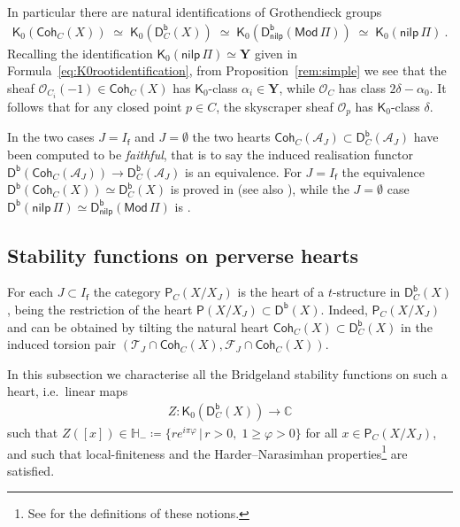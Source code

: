 \documentclass[reqno,a4paper]{amsart}
\newcommand{\calA}{\mathcal{A}}
\newcommand{\C}{\mathbb{C}}
\newcommand{\HH}{\mathbb{H}}
\newcommand{\scrF}{\mathscr{F}}
\newcommand{\scrO}{\mathscr{O}}
\newcommand{\scrT}{\mathscr{T}}
\newcommand{\sfK}{\mathsf{K}}
\newcommand{\sff}{\mathsf{f}}
\newcommand{\bfY}{\mathbf{Y}}
\newcommand{\catMod}{\mathsf{Mod}}
\newcommand{\catP}{\mathsf{P}}
\newcommand{\catPC}{\mathsf{P}_{C}}
\newcommand{\ModPi}{\catMod\, \Pi}
\newcommand{\nilpPi}{\mathsf{nilp}\, \Pi}
\newcommand{\catCohC}{\mathsf{Coh}_C}
\newcommand{\catDb}{\mathsf{D}^\mathsf{b}}
\newcommand{\catDbC}{\mathsf{D}^\mathsf{b}_C}
\newcommand{\rootlattice}{\bfY}
\newcommand{\rsv}{X}
\newcommand{\psv}{X_J}
\theoremstyle{basic-theorem}
\numberwithin{equation}{section}
\begin{document}
 In particular there are natural identifications of Grothendieck groups
\begin{align}
	\sfK_0(\catCohC(\rsv))\;\simeq\; \sfK_0(\catDbC(\rsv)) \;\simeq\; \sfK_0(\catDb_\mathsf{nilp}(\ModPi))\;\simeq\; \sfK_0(\nilpPi)\ .
\end{align}
Recalling the identification $\sfK_0(\nilpPi)\simeq \rootlattice$ given in Formula~\eqref{eq:K0rootidentification}, from Proposition~\ref{rem:simple} we see that the sheaf
$\scrO_{C_i}(-1)\in \catCohC(\rsv)$ has $\sfK_0$-class $\alpha_i\in \rootlattice$, while $\scrO_C$ has class $2\delta-\alpha_0$. It follows that for any closed point $p\in C$, the skyscraper sheaf $\scrO_p$ has $\sfK_0$-class $\delta$.

\begin{remark}
    In the two cases $J=I_\sff$ and $J=\emptyset$ the two hearts $\catCohC(\calA_J)\subset \catDbC(\calA_J)$ have been computed to be \textit{faithful}, that is to say the induced realisation functor $\catDb(\catCohC(\calA_J))\to \catDbC(\calA_J)$ is an equivalence. For $J=I_\sff$ the equivalence $\catDb(\catCohC (\rsv))\simeq \catDbC(\rsv)$ is proved in \cite[Corollary~3.4]{Sheaves_local_CY} (see also \cite[Lemma~2.1]{orlovFormalCompletionsIdempotent}), while the $J=\emptyset$ case $\catDb(\nilpPi)\simeq \catDb_\mathsf{nilp}(\ModPi)$ is \cite[Theorem~1.4]{Lewis_stability}.
\end{remark}

\subsection{Stability functions on perverse hearts}\label{subsec:stabconds-perversehearts}

For each $J\subset I_\sff$ the category $\catPC(\rsv/\psv)$ is the heart of a $t$-structure in $\catDbC(\rsv)$, being the restriction of the heart $\catP(\rsv/\psv)\subset \catDb(\rsv)$. Indeed, $\catPC(\rsv/\psv)$ and can be obtained by tilting the natural heart $\catCohC(\rsv)\subset \catDbC(\rsv)$ in the induced torsion pair $(\scrT_J\cap \catCohC(\rsv), \scrF_J\cap\catCohC(\rsv))$.

In this subsection we characterise all the Bridgeland stability functions on such a heart, i.e.\ linear maps 
\begin{align}
	Z\colon \sfK_0(\catDbC(\rsv))\longrightarrow \C
\end{align}
such that $Z([x])\in \HH_-\coloneqq\{re^{i\pi\varphi}\,\vert\, r>0,\; 1\geq \varphi>0\}$ for all $x\in \catPC(\rsv/\psv)$, and such that local-finiteness and the Harder--Narasimhan properties\footnote{See \cite[Definitions~5.7 and 2.3]{B07} for the definitions of these notions.} are satisfied.
\end{document}
